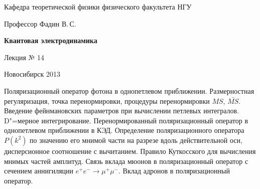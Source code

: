 \documentclass[12pt,pagesize,paper=192mm:108mm]{scrbook}
\begin{document}
\begin{titlepage}
\begin{center}
    Кафедра теоретической физики физического факультета НГУ
    \medskip

    \Large
    Профессор Фадин В.\,С.
    \bigskip

    \huge
    \textbf{Квантовая электродинамика}
    \bigskip

    \Large
    Лекция № 14
    \vfill

    \normalsize
    \vfill

    \normalsize \ccbysa\hspace{0.5em}  Новосибирск 2013
  \end{center}
\end{titlepage}
\vspace*{-1em}
\begin{center}
\vfill
  \begin{minipage}{0.65\linewidth}
    Поляризационный оператор фотона в однопетлевом
    приближении. Размерностная регуляризация, точка перенормировки,
    процедуры перенормировки $MS$, $\bar{MS}$.  Введение фейнмановских
    параметров при вычислении петлевых интегралов. D"=мерное
    интегрирование. Перенормированный поляризационный оператор в
    однопетлевом приближении в КЭД. Определение поляризационного
    оператора $P(k^2)$ по значению его мнимой части на разрезе вдоль
    действительной оси, дисперсионное соотношение с вычитанием.
    Правило Куткосского для вычисления мнимых частей амплитуд. Связь
    вклада мюонов в поляризационный оператор с сечением аннигиляции
    $e^+e^- \to \mu^+\mu^-$. Вклад адронов в поляризационный оператор.
  \end{minipage}
  \vfill

\end{center}
\end{document}
